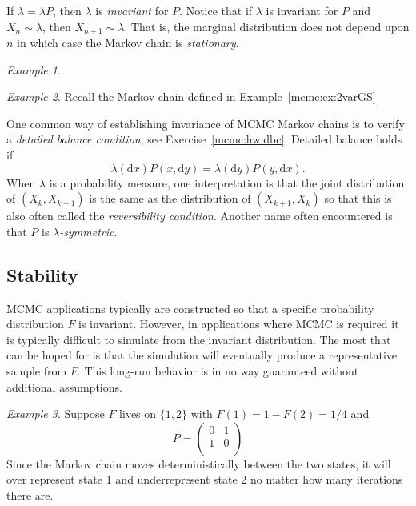 \documentclass[12pt]{article}
\theoremstyle{plain}
\theoremstyle{definition}
\theoremstyle{remark}
\newtheorem{example}{Example}[section]
\newcommand{\df}{\mathrm{d}}
\begin{document}
If $\lambda = \lambda P$, then $\lambda$ is {\em invariant} for $P$.
Notice that if $\lambda$ is invariant for $P$ and $X_n \sim \lambda$,
then $X_{n+1} \sim \lambda$.  That is, the marginal distribution does
not depend upon $n$ in which case the Markov chain is {\em
  stationary}.

\begin{example}
  \end{example}

\begin{example}
  Recall the Markov chain defined in Example~\eqref{mcmc:ex:2varGS}
\end{example}


One common way of establishing invariance of MCMC Markov chains is to
verify a {\em detailed balance condition}; see
Exercise~\ref{mcmc:hw:dbc}.  Detailed balance holds if
\begin{equation}
   \label{mcmc:eq:dbc}
   \lambda(\df x) P(x, \df y) = \lambda(\df y) P(y, \df x). 
 \end{equation}
 When $\lambda$ is a probability measure, one interpretation is that
 the joint distribution of $(X_k, X_{k+1})$ is the same as the
 distribution of $(X_{k+1}, X_{k})$ so that this is also often called
 the {\em reversibility condition}.  Another name often encountered is
 that $P$ is {\em $\lambda$-symmetric}.

 \subsection{Stability}
 \label{mcmc:sec:stability}
MCMC applications typically are constructed so that a specific probability
 distribution $F$ is invariant.  However, in applications where MCMC is
 required it is typically difficult to simulate from the invariant
 distribution.  The most that can be hoped for is that the simulation
 will eventually produce a representative sample from $F$.  This
 long-run behavior is in no way guaranteed without additional assumptions.

 \begin{example}
   \label{mcmc:ex:detmc}
   Suppose $F$ lives on $\{ 1, 2\}$ with $F(1) = 1 - F(2) = 1/4$ and
   \[
     P = \begin{pmatrix}
       0 & 1 \\
       1 & 0 \\
       \end{pmatrix}
   \]
   Since the Markov chain moves deterministically between the two
   states, it will over represent state 1 and underrepresent state 2
   no matter how many iterations there are.
 \end{example}
 
\end{document}
